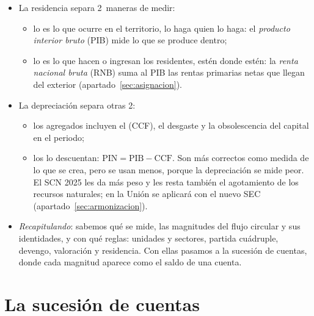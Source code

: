 \documentclass[11pt]{article}
\begin{document}
\begin{itemize}
\item La residencia separa 2~maneras de medir:
  \begin{itemize}
  \item lo  es lo que ocurre en el territorio, lo haga quien lo haga: el \emph{producto interior bruto} (PIB) mide lo que se produce dentro;
  \item lo  es lo que hacen o ingresan los residentes, estén donde estén: la \emph{renta nacional bruta} (RNB) suma al PIB las rentas primarias netas que llegan del exterior (apartado~\ref{sec:asignacion}).
  \end{itemize}
\item La depreciación separa otras 2:
  \begin{itemize}
  \item los agregados  incluyen el  (CCF), el desgaste y la obsolescencia del capital en el periodo;
  \item los  lo descuentan: $\mathrm{PIN}=\mathrm{PIB}-\mathrm{CCF}$. Son más correctos como medida de lo que se crea, pero se usan menos, porque la depreciación se mide peor. El SCN 2025 les da más peso y les resta también el agotamiento de los recursos naturales; en la Unión se aplicará con el nuevo SEC (apartado~\ref{sec:armonizacion}).
  \end{itemize}
\end{itemize}

\begin{itemize}
\item \emph{Recapitulando}: sabemos qué se mide, las magnitudes del flujo circular y sus identidades, y con qué reglas: unidades y sectores, partida cuádruple, devengo, valoración y residencia. Con ellas pasamos a la sucesión de cuentas, donde cada magnitud aparece como el saldo de una cuenta.
\end{itemize}


\section{La sucesión de cuentas}\label{sec:sucesion}
\end{document}
